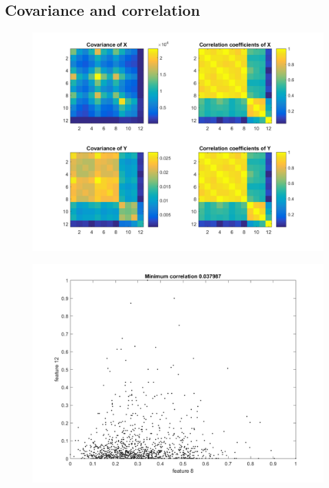 \documentclass[a4paper,11pt]{article}
\begin{document}
\subsection{Covariance and correlation}
\begin{figure}[h]
  \begin{center}
    \includegraphics[width=\textwidth]{P2_2a}
    \caption{}
    \label{fig:}
  \end{center}
\end{figure}
\begin{figure}[h]
  \begin{center}
    \includegraphics[width=\textwidth]{P2_2b}
    \caption{}
    \label{fig:}
  \end{center}
\end{figure}
\end{document}
